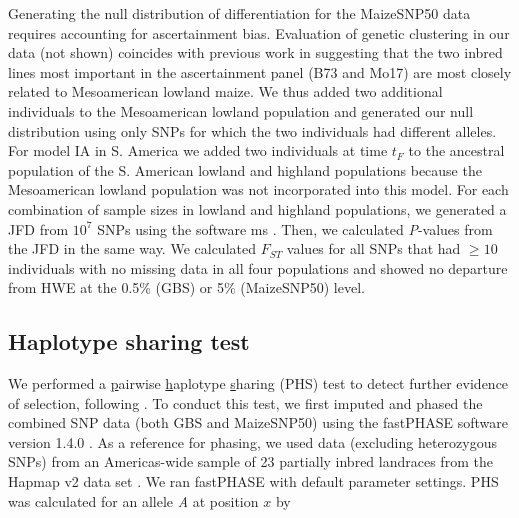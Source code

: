 Generating the null distribution of differentiation for the MaizeSNP50 data requires accounting for ascertainment bias. 
Evaluation of genetic clustering in our data (not shown) coincides with previous work \cite[]{Hufford_2012_22660546} in suggesting that the two inbred lines most important in the ascertainment panel (B73 and Mo17) are most closely related to Mesoamerican lowland maize.  
We thus added two additional individuals to the Mesoamerican lowland population and generated our null distribution using only SNPs for which the two individuals had different alleles.
For model IA in S. America we added two individuals at time $t_F$ to the ancestral population of the S. American lowland and highland populations because the Mesoamerican lowland population was not incorporated into this model. 
For each combination of sample sizes in lowland and highland populations, we generated a JFD from $10^7$  SNPs using the software {\sf ms} \cite[]{Hudson_2002_11847089}.
Then, we calculated \emph{P}-values from the JFD in the same way.
We calculated $F_{ST}$ values for all SNPs that had $\geq10$ individuals with no missing data in all four populations and showed no departure from HWE at the 0.5\% (GBS) or 5\% (MaizeSNP50) level. 



\subsection*{Haplotype sharing test}
We performed a \underline{p}airwise \underline{h}aplotype \underline{s}haring (PHS) test to detect further evidence of selection, following \cite{Toomajian_2006_16623598}.  
To conduct this test, we first imputed and phased the combined SNP data (both GBS and MaizeSNP50) using the {\sf fastPHASE} software version 1.4.0 \cite[]{Scheet_2006_16532393}.  
As a reference for phasing, we used data (excluding heterozygous SNPs) from an Americas-wide sample of 23 partially inbred landraces from the Hapmap v2 data set  \cite[]{Chia_2012_22660545}.  
We ran {\sf fastPHASE}  with default parameter settings.  
PHS was calculated for an allele \emph{A} at position $x$ by


